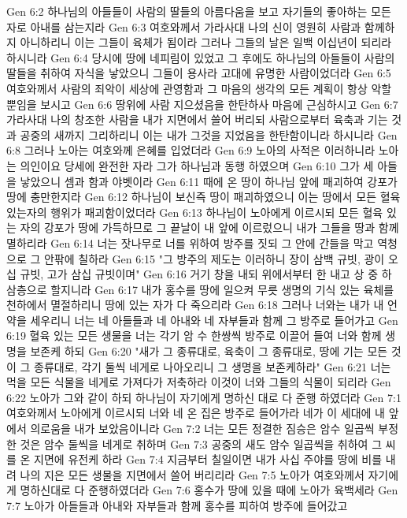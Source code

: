Gen 6:2  하나님의 아들들이 사람의 딸들의 아름다움을 보고 자기들의 좋아하는 모든 자로 아내를 삼는지라
Gen 6:3  여호와께서 가라사대 나의 신이 영원히 사람과 함께하지 아니하리니 이는 그들이 육체가 됨이라 그러나 그들의 날은 일백 이십년이 되리라 하시니라
Gen 6:4  당시에 땅에 네피림이 있었고 그 후에도 하나님의 아들들이 사람의 딸들을 취하여 자식을 낳았으니 그들이 용사라 고대에 유명한 사람이었더라
Gen 6:5  여호와께서 사람의 죄악이 세상에 관영함과 그 마음의 생각의 모든 계획이 항상 악할 뿐임을 보시고
Gen 6:6  땅위에 사람 지으셨음을 한탄하사 마음에 근심하시고
Gen 6:7  가라사대 나의 창조한 사람을 내가 지면에서 쓸어 버리되 사람으로부터 육축과 기는 것과 공중의 새까지 그리하리니 이는 내가 그것을 지었음을 한탄함이니라 하시니라
Gen 6:8  그러나 노아는 여호와께 은혜를 입었더라
Gen 6:9  노아의 사적은 이러하니라 노아는 의인이요 당세에 완전한 자라 그가 하나님과 동행 하였으며
Gen 6:10  그가 세 아들을 낳았으니 셈과 함과 야벳이라
Gen 6:11  때에 온 땅이 하나님 앞에 패괴하여 강포가 땅에 충만한지라
Gen 6:12  하나님이 보신즉 땅이 패괴하였으니 이는 땅에서 모든 혈육 있는자의 행위가 패괴함이었더라
Gen 6:13  하나님이 노아에게 이르시되 모든 혈육 있는 자의 강포가 땅에 가득하므로 그 끝날이 내 앞에 이르렀으니 내가 그들을 땅과 함께 멸하리라
Gen 6:14  너는 잣나무로 너를 위하여 방주를 짓되 그 안에 간들을 막고 역청으로 그 안팎에 칠하라
Gen 6:15  "그 방주의 제도는 이러하니 장이 삼백 규빗, 광이 오십 규빗, 고가 삼십 규빗이며"
Gen 6:16  거기 창을 내되 위에서부터 한 내고 상 중 하 삼층으로 할지니라
Gen 6:17  내가 홍수를 땅에 일으켜 무릇 생명의 기식 있는 육체를 천하에서 멸절하리니 땅에 있는 자가 다 죽으리라
Gen 6:18  그러나 너와는 내가 내 언약을 세우리니 너는 네 아들들과 네 아내와 네 자부들과 함께 그 방주로 들어가고
Gen 6:19  혈육 있는 모든 생물을 너는 각기 암 수 한쌍씩 방주로 이끌어 들여 너와 함께 생명을 보존케 하되
Gen 6:20  "새가 그 종류대로, 육축이 그 종류대로, 땅에 기는 모든 것이 그 종류대로, 각기 둘씩 네게로 나아오리니 그 생명을 보존케하라"
Gen 6:21  너는 먹을 모든 식물을 네게로 가져다가 저축하라 이것이 너와 그들의 식물이 되리라
Gen 6:22  노아가 그와 같이 하되 하나님이 자기에게 명하신 대로 다 준행 하였더라
Gen 7:1  여호와께서 노아에게 이르시되 너와 네 온 집은 방주로 들어가라 네가 이 세대에 내 앞에서 의로움을 내가 보았음이니라
Gen 7:2  너는 모든 정결한 짐승은 암수 일곱씩 부정한 것은 암수 둘씩을 네게로 취하며
Gen 7:3  공중의 새도 암수 일곱씩을 취하여 그 씨를 온 지면에 유전케 하라
Gen 7:4  지금부터 칠일이면 내가 사십 주야를 땅에 비를 내려 나의 지은 모든 생물을 지면에서 쓸어 버리리라
Gen 7:5  노아가 여호와께서 자기에게 명하신대로 다 준행하였더라
Gen 7:6  홍수가 땅에 있을 때에 노아가 육백세라
Gen 7:7  노아가 아들들과 아내와 자부들과 함께 홍수를 피하여 방주에 들어갔고
